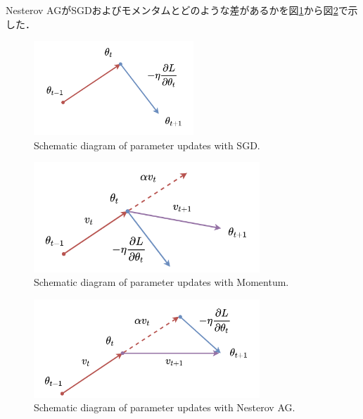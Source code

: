     Nesterov AGがSGDおよびモメンタムとどのような差があるかを図\ref{SGD_update}から図\ref{Nesterov_update}で示した．
    \begin{figure}[ht]
        \begin{center}
            \includegraphics[width=6cm]{./8_appendix/img/SGD.png}
            \caption{Schematic diagram of parameter updates with SGD.}
            \label{SGD_update}
        \end{center}
    \end{figure}
    \begin{figure}[ht]
        \begin{center}
            \includegraphics[width=8.5cm]{./8_appendix/img/momentum.png}
            \caption{Schematic diagram of parameter updates with Momentum.}
        \end{center}
    \end{figure}
    \begin{figure}[ht]
        \begin{center}
            \includegraphics[width=8.5cm]{./8_appendix/img/Nesterov.png}
            \caption{Schematic diagram of parameter updates with Nesterov AG.}
            \label{Nesterov_update}
        \end{center}
    \end{figure}

